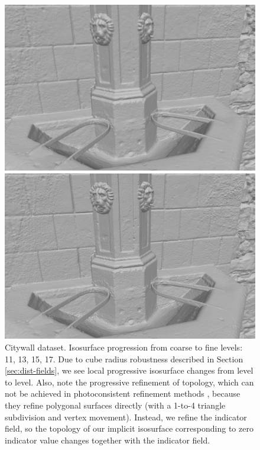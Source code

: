 \documentclass[10pt,twocolumn,letterpaper]{article}
\begin{document}
\begin{figure}
\begin{minipage}[b]{\linewidth}
        \begin{minipage}[b]{0.49\linewidth}
            \includegraphics[width=\textwidth]{images/figures/results/citywall/levels/level15.jpg}
        \end{minipage}
        \begin{minipage}[b]{0.49\linewidth}
            \includegraphics[width=\textwidth]{images/figures/results/citywall/levels/level17.jpg}
        \end{minipage}
    \end{minipage}
    \caption{Citywall dataset. Isosurface progression from coarse to fine levels: 11, 13, 15, 17.
    Due to cube radius robustness described in Section \ref{sec:dist-fields}, we see local progressive isosurface changes
    from level to level. Also, note the progressive refinement of topology, which can not be achieved in photoconsistent refinement methods \cite{vu2011high}, \cite{li2016efficient}
    because they refine polygonal surfaces directly (with a 1-to-4 triangle subdivision and vertex movement). Instead, we refine the indicator field, so the topology
    of our implicit isosurface corresponding to zero indicator value changes together with the indicator field.}
    \label{fig:citywall_coarse_to_fine}
\end{figure}
\end{document}
